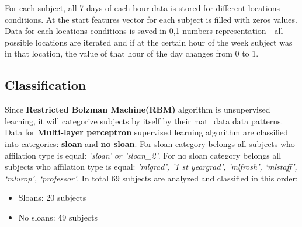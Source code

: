 \documentclass[paper=letter, fontsize=12pt]{article}
\begin{document}
For each subject, all 7 days of each hour data is stored for different locations conditions.
\newline
At the start features vector for each subject is filled with zeros values. Data for each locations conditions is saved in 0,1 numbers representation - all possible locations are iterated and if at the certain hour of the week subject was in that location, the value of that hour of the day changes from 0 to 1.

\subsection{Classification}
\label{sec:classimple}
Since \textbf{Restricted Bolzman Machine(RBM)} algorithm is unsupervised learning, it will categorize subjects by itself by their mat\_data data patterns.
Data for \textbf{Multi-layer perceptron} supervised learning algorithm are classified into categories: \textbf{sloan} and \textbf{no sloan}.
\newline
For sloan category belongs all subjects who affilation type is equal: \textit{'sloan' or 'sloan\_2'}.
For no sloan category belongs all subjects who affilation type is equal:  \textit{'mlgrad', '1 st yeargrad', 'mlfrosh', `mlstaff', `mlurop', `professor'}. 
\newline
In total 69 subjects are analyzed and classified in this order:
\begin{itemize}
\item Sloans: 20 subjects
\item No sloans: 49 subjects
\end{itemize}
\end{document}
